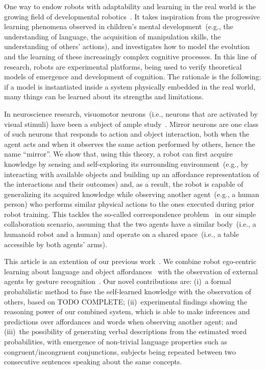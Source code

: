 One way to endow robots with adaptability and learning in the real world is the growing field of developmental robotics~\cite{lungarella:2003:devrobsurvey,cangelosi:2015:devrobbook}.
It takes inspiration from the progressive learning phenomena observed in children's mental development~(e.g., the understanding of language, the acquisition of manipulation skills, the understanding of others' actions), and investigates how to model the evolution and the learning of these increasingly complex cognitive processes.
In this line of research, robots are experimental platforms, being used to verify theoretical models of emergence and development of cognition.
The rationale is the following: if a model is instantiated inside a system physically embedded in the real world, many things can be learned about its strengths and limitations.

In neuroscience research, visuomotor neurons~(i.e., neurons that are activated by visual stimuli) have been a subject of ample study~\cite{rizzolatti:2001:nrn}.
Mirror neurons are one class of such neurons that responds to action and object interaction, both when the agent acts and when it observes the same action performed by others, hence the name ``mirror''.
We show that, using this theory, a robot can first acquire knowledge by sensing and self-exploring its surrounding environment~(e.g., by interacting with available objects and building up an affordance representation of the interactions and their outcomes) and, as a result, the robot is capable of generalizing its acquired knowledge while observing another agent~(e.g., a human person) who performs similar physical actions to the ones executed during prior robot training.
This tackles the so-called correspondence problem~\cite{nehaniv:2002:correspondence} in our simple collaboration scenario, assuming that the two agents have a similar body~(i.e., a humanoid robot and a human) and operate on a shared space~(i.e., a table accessible by both agents' arms).

This article is an extention of our previous work~\cite{saponaro:2017:glu}.
We combine robot ego-centric learning about language and object affordances~\cite{salvi:2012:smcb} with the observation of external agents by gesture recognition~\cite{saponaro:2013:crhri}.
Our novel contributions are:
(i)~a formal probabilistic method to fuse the self-learned knowledge with the observation of others, based on TODO COMPLETE;
(ii)~experimental findings showing the reasoning power of our combined system, which is able to make inferences and predictions over affordances and words when observing another agent; and
(iii)~the possibility of generating verbal descriptions from the estimated word probabilities, with emergence of non-trivial language properties such as congruent/incongruent conjunctions, subjects being repeated between two consecutive sentences speaking about the same concepts.

